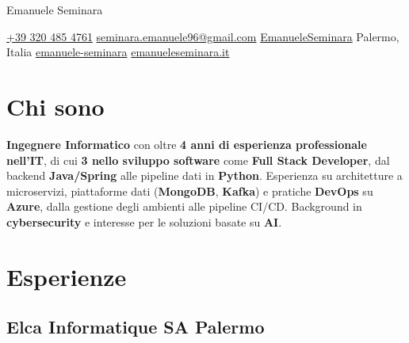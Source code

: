 \documentclass[11pt]{article}
\newcommand{\rside}[1]{
  \hfill {\normalfont\color{accent} #1}%
}
\begin{document}

\begin{center}
  {
    \fontsize{36}{12} 
    \selectfont
    \color{accent} 
    Emanuele Seminara %
  } \\ \medskip


  \href{tel:+393204854761}{{\color{gray}{\faPhone}} +39 320 485 4761} \quad
  \href{mailto:seminara.emanuele96@gmail.com}{{\color{gray}{\faEnvelope}} seminara.emanuele96@gmail.com} \quad 
  \href{https://github.com/EmanueleSeminara}{{\color{gray}{\faGithub}} EmanueleSeminara} \quad \quad \quad \quad
  {\color{gray}{\faHome}} Palermo, Italia \quad
  \href{https://www.linkedin.com/in/emanuele-seminara/}{{\color{gray}{\faLinkedin}} emanuele-seminara} \quad
  \href{https://emanueleseminara.it/}{{\color{gray}{\faLink}} emanueleseminara.it} 
\end{center}



\section{Chi sono}
\noindent \textbf{Ingegnere Informatico} con oltre \textbf{4 anni di esperienza professionale nell'IT}, di cui \textbf{3 nello sviluppo software} come \textbf{Full Stack Developer}, dal backend \textbf{Java/Spring} alle pipeline dati in \textbf{Python}. Esperienza su architetture a microservizi, piattaforme dati (\textbf{MongoDB}, \textbf{Kafka}) e pratiche \textbf{DevOps} su \textbf{Azure}, dalla gestione degli ambienti alle pipeline CI/CD. Background in \textbf{cybersecurity} e interesse per le soluzioni basate su \textbf{AI}.

\section{Esperienze}
\subsection{Elca Informatique SA \rside{Palermo}}
\end{document}
